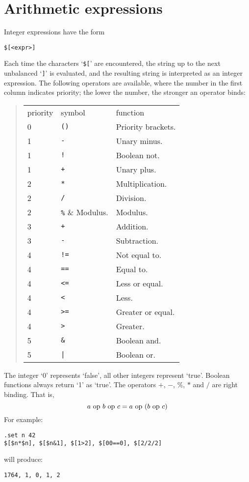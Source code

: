 \section{Arithmetic expressions}
\label{s.intexpr}
Integer expressions have the form
\begin{verbatim}
$[<expr>]
\end{verbatim}
Each time the characters `{\tt \$[}' are encountered,
the string up to the next unbalanced `{\tt ]}' is evaluated,
and the resulting string is
interpreted as an integer expression.
The following operators are available, where the number in the first column
indicates priority; the lower the number, the stronger an operator binds:
\begin{quote}
\begin{tabular}{lll}
priority & symbol & function \\
0 & \verb'()' & Priority brackets. \\
1 & \verb'-' & Unary minus. \\
1 & \verb'!' & Boolean not. \\
1 & \verb'+' & Unary plus. \\
2 & \verb'*' & Multiplication. \\
2 & \verb'/' & Division. \\
2 & \verb'%' & Modulus. \\
3 & \verb'+' & Addition. \\
3 & \verb'-' & Subtraction.\\
4 & \verb'!=' & Not equal to. \\
4 & \verb'==' & Equal to. \\
4 & \verb'<=' & Less or equal. \\
4 & \verb'<' & Less. \\
4 & \verb'>=' & Greater or equal. \\
4 & \verb'>' & Greater. \\
5 & \verb'&' & Boolean and. \\
5 & \verb'|' & Boolean or. \\
\end{tabular}
\end{quote}
The integer `0' represents `false',
all other integers represent `true'.
Boolean functions always return `1' as `true'.
The operators $+$, $-$, $\%$, $*$ and $/$ are right binding.
That is,
\[ a\ {\rm op}\ b\ {\rm op}\ c = a\ {\rm op}\ (b\ {\rm op}\ c) \]
For example:
\begin{verbatim}
.set n 42
$[$n*$n], $[$n&1], $[1>2], $[00==0], $[2/2/2]
\end{verbatim}
will produce:
\begin{verbatim}
1764, 1, 0, 1, 2
\end{verbatim}
